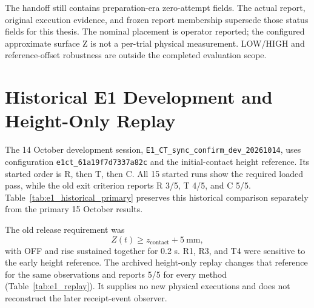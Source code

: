 The handoff  still contains preparation-era zero-attempt fields. The actual report, original execution evidence, and frozen report membership supersede those status fields for this thesis. The nominal placement is operator reported; the configured approximate surface Z is not a per-trial physical measurement. LOW/HIGH and reference-offset robustness are outside the completed evaluation scope.

\section{Historical E1 Development and Height-Only Replay}
\label{app:e1_history}
The 14 October development session, \texttt{E1\_CT\_sync\_confirm\_dev\_20261014}, uses configuration \texttt{e1ct\_61a19f7d7337a82c} and the initial-contact height reference. Its started order is R, then T, then C. All 15 started runs show the required loaded pass, while the old exit criterion reports R 3/5, T 4/5, and C 5/5. Table~\ref{tab:e1_historical_primary} preserves this historical comparison separately from the primary 15 October results.

\begin{table}[tbp]\centering\footnotesize
\caption[Historical 14 October E1 results]{Historical 14 October E1 development cohort with the initial-contact height reference. Completed-time means use \(n=3,4,5\) for R/T/C; excess-force summaries retain five started runs per method. These executions are not pooled with the primary cohort.}
\label{tab:e1_historical_primary}
\end{table}

The old release requirement was
\begin{equation}
 Z(t)\geq z_{\mathrm{contact}}+5\ \mathrm{mm},
 \label{eq:original_release}
\end{equation}
with OFF and rise sustained together for 0.2 s. R1, R3, and T4 were sensitive to the early height reference. The archived height-only replay changes that reference for the same observations and reports 5/5 for every method (Table~\ref{tab:e1_replay}). It supplies no new physical executions and does not reconstruct the later receipt-event observer.

\begin{table}[tbp]\centering\small
\caption[Historical E1 height-only replay]{Height-only offline replay of the 14 October records. This secondary sensitivity analysis changes the release reference, retains the recorded trajectories, and adds no independent trials.}
\label{tab:e1_replay}
\end{table}

